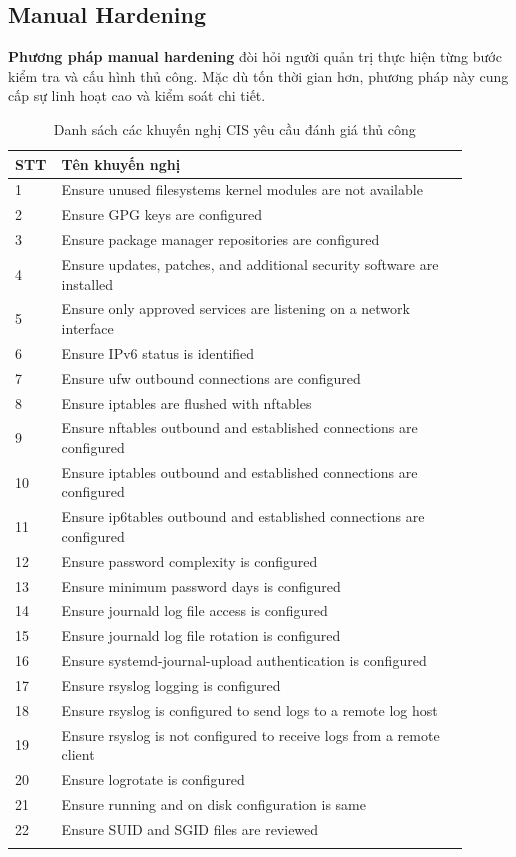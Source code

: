 \subsection{Manual Hardening}
\noindent \textbf{Phương pháp manual hardening} đòi hỏi người quản trị thực hiện từng bước kiểm tra và cấu hình thủ công. Mặc dù tốn thời gian hơn, phương pháp này cung cấp sự linh hoạt cao và kiểm soát chi tiết.

\begin{longtable}{|p{0.05\linewidth}|p{0.85\linewidth}|}
\hline
\textbf{STT} & \textbf{Tên khuyến nghị} \\
\hline
\endhead
1 & Ensure unused filesystems kernel modules are not available \\
2 & Ensure GPG keys are configured \\
3 & Ensure package manager repositories are configured \\
4 & Ensure updates, patches, and additional security software are installed \\
5 & Ensure only approved services are listening on a network interface \\
6 & Ensure IPv6 status is identified \\
7 & Ensure ufw outbound connections are configured \\
8 & Ensure iptables are flushed with nftables \\
9 & Ensure nftables outbound and established connections are configured \\
10 & Ensure iptables outbound and established connections are configured \\
11 & Ensure ip6tables outbound and established connections are configured \\
12 & Ensure password complexity is configured \\
13 & Ensure minimum password days is configured \\
14 & Ensure journald log file access is configured \\
15 & Ensure journald log file rotation is configured \\
16 & Ensure systemd-journal-upload authentication is configured \\
17 & Ensure rsyslog logging is configured \\
18 & Ensure rsyslog is configured to send logs to a remote log host \\
19 & Ensure rsyslog is not configured to receive logs from a remote client \\
20 & Ensure logrotate is configured \\
21 & Ensure running and on disk configuration is same \\
22 & Ensure SUID and SGID files are reviewed \\
\hline
\caption{Danh sách các khuyến nghị CIS yêu cầu đánh giá thủ công}
\label{tab:manual_recommendations}
\end{longtable}

